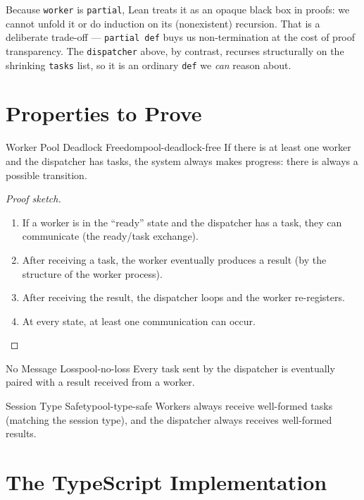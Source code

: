 \documentclass[11pt, a4paper, oneside]{book}
\newcommand{\lc}[1]{\texttt{#1}}
\begin{document}
Because \lc{worker} is \lc{partial}, Lean treats it as an opaque black box in
proofs: we cannot unfold it or do induction on its (nonexistent) recursion.
That is a deliberate trade-off --- \lc{partial def} buys us
non-termination at the cost of proof transparency. The \lc{dispatcher} above,
by contrast, recurses structurally on the shrinking \lc{tasks} list, so it is
an ordinary \lc{def} we \emph{can} reason about.

\section{Properties to Prove}

\begin{thm}{Worker Pool Deadlock Freedom}{pool-deadlock-free}
If there is at least one worker and the dispatcher has tasks, the system
always makes progress: there is always a possible transition.
\end{thm}

\begin{proof}[Proof sketch]
\begin{enumerate}[nosep]
\item If a worker is in the ``ready'' state and the dispatcher has a task,
  they can communicate (the ready/task exchange).
\item After receiving a task, the worker eventually produces a result
  (by the structure of the worker process).
\item After receiving the result, the dispatcher loops and the worker
  re-registers.
\item At every state, at least one communication can occur. \qedhere
\end{enumerate}
\end{proof}

\begin{thm}{No Message Loss}{pool-no-loss}
Every task sent by the dispatcher is eventually paired with a result
received from a worker.
\end{thm}

\begin{thm}{Session Type Safety}{pool-type-safe}
Workers always receive well-formed tasks (matching the session type),
and the dispatcher always receives well-formed results.
\end{thm}

\section{The TypeScript Implementation}
\end{document}
